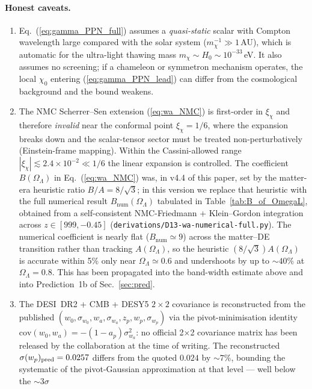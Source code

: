 \documentclass[epjc3,twocolumn]{svjour3}
\begin{document}
\paragraph{Honest caveats.}
\begin{enumerate}
\item Eq.~(\ref{eq:gamma_PPN_full}) assumes a \emph{quasi-static} scalar with Compton wavelength
  large compared with the solar system ($m_\chi^{-1}\gg 1\,$AU), which is automatic for the
  ultra-light thawing mass $m_\chi\sim H_0\sim 10^{-33}$\,eV. It also assumes no screening; if
  a chameleon or symmetron mechanism operates, the local $\chi_0$ entering
  (\ref{eq:gamma_PPN_lead}) can differ from the cosmological background and the bound weakens.
\item The NMC Scherrer--Sen extension (\ref{eq:wa_NMC}) is first-order in $\xi_\chi$ and
  therefore \emph{invalid} near the conformal point $\xi_\chi=1/6$, where the expansion breaks
  down and the scalar-tensor sector must be treated non-perturbatively (Einstein-frame
  mapping). Within the Cassini-allowed range $|\xi_\chi|\lesssim 2.4\times 10^{-2}\ll 1/6$
  the linear expansion is controlled. The coefficient $B(\Omega_\Lambda)$ in
  Eq.~(\ref{eq:wa_NMC}) was, in v4.4 of this paper, set by the matter-era
  heuristic ratio $B/A=8/\sqrt3$; in this version we replace that heuristic with
  the full numerical result $B_{\mathrm{num}}(\Omega_\Lambda)$ tabulated in
  Table~\ref{tab:B_of_OmegaL}, obtained from a self-consistent
  NMC-Friedmann + Klein--Gordon integration across $z\in[999,-0.45]$
  (\texttt{derivations/D13-wa-numerical-full.py}). The numerical coefficient is
  nearly flat ($B_{\mathrm{num}}\simeq 9$) across the matter--DE transition
  rather than tracking $A(\Omega_\Lambda)$, so the heuristic
  $(8/\sqrt3)A(\Omega_\Lambda)$ is accurate within 5\% only near
  $\Omega_\Lambda\simeq 0.6$ and undershoots by up to $\sim\!40\%$ at
  $\Omega_\Lambda=0.8$. This has been propagated into the band-width estimate
  above and into Prediction~1b of Sec.~\ref{sec:pred}.
\item The DESI~DR2 + CMB + DESY5 $2\times 2$ covariance is reconstructed from the published
  $(w_0,\sigma_{w_0},w_a,\sigma_{w_a},z_p,w_p,\sigma_{w_p})$ via the pivot-minimisation
  identity $\mathrm{cov}(w_0,w_a)=-(1-a_p)\sigma_{w_a}^2$: no official 2$\times$2 covariance
  matrix has been released by the collaboration at the time of writing. The reconstructed
  $\sigma(w_p)_{\rm pred}=0.0257$ differs from the quoted $0.024$ by $\sim 7\%$, bounding the
  systematic of the pivot-Gaussian approximation at that level --- well below the $\sim 3\sigma$

\end{enumerate}
\end{document}
